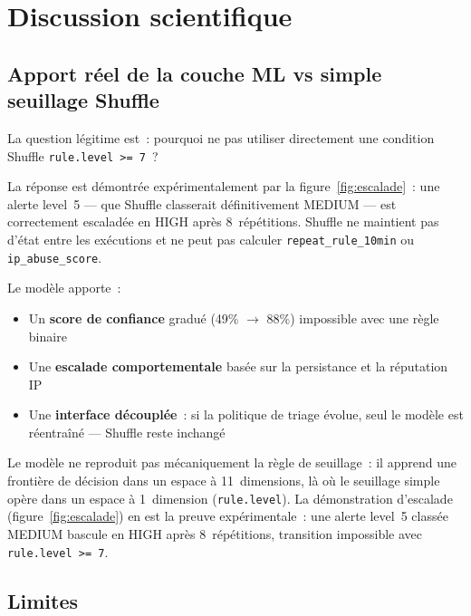 \documentclass[12pt,a4paper]{report}
\begin{document}
\needspace{6cm}
\section{Discussion scientifique}

\needspace{6cm}
\subsection{Apport réel de la couche ML vs simple seuillage Shuffle}

La question légitime est~: pourquoi ne pas utiliser directement une condition Shuffle \texttt{rule.level >= 7}~?

La réponse est démontrée expérimentalement par la figure~\ref{fig:escalade}~: une alerte level~5 — que Shuffle classerait définitivement MEDIUM — est correctement escaladée en HIGH après 8~répétitions. Shuffle ne maintient pas d'état entre les exécutions et ne peut pas calculer \texttt{repeat\_rule\_10min} ou \texttt{ip\_abuse\_score}.

Le modèle apporte~:
\begin{itemize}
  \item Un \textbf{score de confiance} gradué (49\% $\rightarrow$ 88\%) impossible avec une règle binaire
  \item Une \textbf{escalade comportementale} basée sur la persistance et la réputation IP
  \item Une \textbf{interface découplée}~: si la politique de triage évolue, seul le modèle est réentraîné — Shuffle reste inchangé
\end{itemize}

Le modèle ne reproduit pas mécaniquement la règle de seuillage~: il apprend une frontière de décision dans un espace à 11~dimensions, là où le seuillage simple opère dans un espace à 1~dimension (\texttt{rule.level}). La démonstration d'escalade (figure~\ref{fig:escalade}) en est la preuve expérimentale~: une alerte level~5 classée MEDIUM bascule en HIGH après 8~répétitions, transition impossible avec \texttt{rule.level >= 7}.

\needspace{6cm}
\subsection{Limites}
\end{document}
